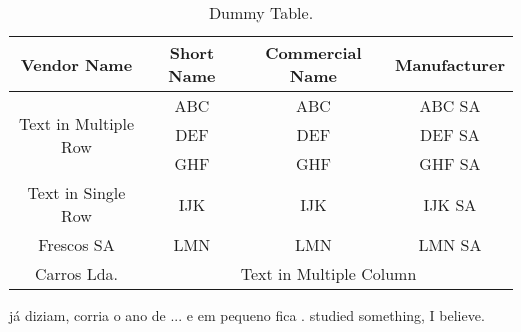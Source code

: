 \begin{table}[H]
	\centering
	\caption{Dummy Table.}
	\begin{tabular}{|c|c|c|c|} \hline
		\textbf{Vendor Name} 				& \textbf{Short Name}	& \textbf{Commercial Name}	& \textbf{Manufacturer}	\\ \hline \hline
		\multirow{3}{*}{Text in Multiple Row}		&	ABC				&  ABC\textreg				& ABC SA			         \\ \cline{2-4}
		 								&        DEF				&  DEF\textreg				& DEF SA				\\ \cline{2-4}
										&        GHF			&  GHF\textreg				& GHF SA				\\ \hline
		Text in Single Row					&        IJK				& IJK\textreg				& IJK SA				\\ \hline
		Frescos SA						&        LMN			& LMN\textreg				& LMN SA				\\ \hline
		Carros Lda.						&    \multicolumn{3}{|c|}{Text in Multiple Column}							\\ \hline
	\end{tabular}
	\label{tab:dummytable}
\end{table}

\citet{history} já diziam, corria o ano de \citeyear{history}...
e em pequeno fica .
\citet{label2} studied something, I believe.
